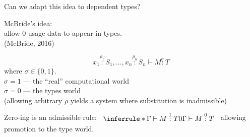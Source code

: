 \documentclass[xetex,serif,mathserif,aspectratio=169]{beamer}
\newcommand{\titlecard}[1]{\begin{frame}%
  \begin{center}%
    \Large \textcolor{titlered}{#1}%
  \end{center}%
\end{frame}}
\begin{document}
\begin{frame}
  Can we adapt this idea to dependent types?

  \pause
  \bigskip

  McBride's idea: \\
  \quad \point allow $0$-usage data to appear in types. \\
  \qquad \textcolor{black!60}{(McBride, 2016)}

  \pause

  \begin{displaymath}
    x_1 \stackrel{\rho_1}: S_1, \dots, x_n \stackrel{\rho_n}: S_n \vdash M \stackrel\sigma: T
  \end{displaymath}
  where $\sigma \in \{0,1\}$. \\
  \qquad \point $\sigma = 1$ --- the ``real'' computational world \\
  \qquad \point $\sigma = 0$ --- the types world \\
  {\footnotesize \textcolor{black!60}{(allowing arbitrary $\rho$ yields a system where substitution is inadmissible)}}


  \pause
  \bigskip

  Zero-ing is an admissible rule:
  $\begin{array}{c}\inferrule* {\Gamma \vdash M \stackrel{1}: T} {0\Gamma \vdash M
    \stackrel{0}: T}\end{array}$ allowing promotion to the type world.
\end{frame}









\end{document}

